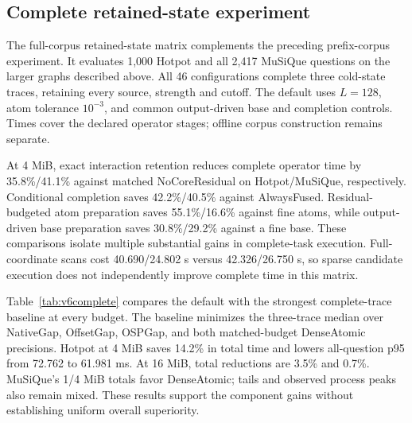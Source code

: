 \subsection{Complete retained-state experiment}\label{sec:v6complete}
The full-corpus retained-state matrix complements the preceding
prefix-corpus experiment. It evaluates 1,000 Hotpot and all 2,417 MuSiQue
questions on the larger graphs described above. All 46 configurations
complete three cold-state traces, retaining every source, strength and cutoff.
The default uses $L=128$, atom tolerance $10^{-3}$, and common output-driven
base and completion controls. Times cover the declared operator stages;
offline corpus construction remains separate.

At 4 MiB, exact interaction retention reduces complete operator time by
35.8\%/41.1\% against matched NoCoreResidual on Hotpot/MuSiQue, respectively.
Conditional completion saves 42.2\%/40.5\% against AlwaysFused.
Residual-budgeted atom preparation saves 55.1\%/16.6\% against fine atoms,
while output-driven base preparation saves 30.8\%/29.2\% against a fine base.
These comparisons isolate multiple substantial gains in complete-task
execution. Full-coordinate scans cost 40.690/24.802 s versus
42.326/26.750 s, so sparse candidate execution does not independently
improve complete time in this matrix.

Table~\ref{tab:v6complete} compares the default with the strongest complete-trace
baseline at every budget. The baseline minimizes the three-trace median over
NativeGap, OffsetGap, OSPGap, and both matched-budget DenseAtomic precisions.
Hotpot at 4 MiB saves 14.2\% in total time and lowers all-question p95 from
72.762 to 61.981 ms. At 16 MiB, total reductions are 3.5\% and 0.7\%.
MuSiQue's 1/4 MiB totals favor DenseAtomic; tails and observed process peaks
also remain mixed. These results support the component gains without
establishing uniform overall superiority.

